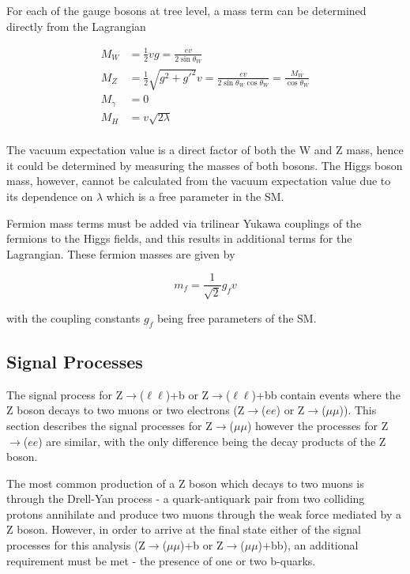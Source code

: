 \documentclass[12pt,a4paper,epsf,portrait,times,epsfig]{report}
\begin{document}
		For each of the gauge bosons at tree level, a mass term can be determined directly from the Lagrangian
		
		\begin{align}
		M_{W} &= \frac{1}{2}vg = \frac{ev}{2\sin\theta_{W}}\\
		M_{Z} &= \frac{1}{2}\sqrt{g^{2}+g'^{2}}v = \frac{ev}{2\sin\theta_{W}\cos\theta_{W}}=\frac{M_{W}}{\cos\theta_{W}} \\
		M_{\gamma} &= 0 \\
		M_{H} &= v\sqrt{2\lambda} \\
		\end{align}
		
		The vacuum expectation value is a direct factor of both the W and Z mass, hence it could be determined by measuring the masses of both bosons. The Higgs boson mass, however, cannot be calculated from the vacuum expectation value due to its dependence on $\lambda$ which is a free parameter in the SM. \par
		Fermion mass terms must be added via trilinear Yukawa couplings of the fermions to the Higgs fields, and this results in additional terms for the Lagrangian. These fermion masses are given by
		
		\begin{equation}
			m_{f} = \frac{1}{\sqrt{2}}g_{f}v
		\end{equation}
		
		with the coupling constants $g_{f}$ being free parameters of the SM. 
		
		\subsection{Signal Processes}
		
		The signal process for Z$\rightarrow$($\ell\ell$)+b or Z$\rightarrow$($\ell\ell$)+bb contain events where the Z boson decays to two muons or two electrons (Z$\rightarrow$($ee$) or Z$\rightarrow$($\mu\mu$)). This section describes the signal processes for Z$\rightarrow$($\mu\mu$) however the processes for Z$\rightarrow$($ee$) are similar, with the only difference being the decay products of the Z boson. \par
		
		The most common production of a Z boson which decays to two muons is through the Drell-Yan process \cite{Article:DrellYan} - a quark-antiquark pair from two colliding protons annihilate and produce two muons through the weak force mediated by a Z boson. However, in order to arrive at the final state either of the signal processes for this analysis (Z$\rightarrow$($\mu\mu$)+b or Z$\rightarrow$($\mu\mu$)+bb), an additional requirement must be met - the presence of one or two b-quarks. \par
		 
\end{document}
